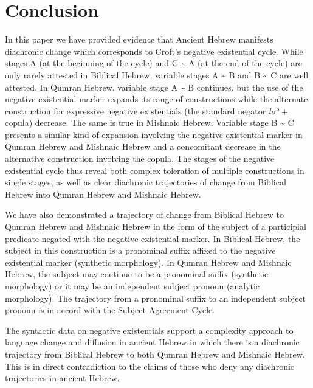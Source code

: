 \documentclass[output=paper,colorlinks,citecolor=brown,draft,draftmode]{langscibook}
\begin{document}
\section{Conclusion}\label{sec:Hebrew-5}
%
In this paper we have provided evidence that Ancient Hebrew manifests
diachronic change which corresponds to Croft's negative existential cycle.
While stages A (at the beginning of the cycle) and C {\textasciitilde} A
(at the end of the cycle) are only rarely attested in Biblical Hebrew,
variable stages A {\textasciitilde} B and B {\textasciitilde} C are well
attested. In Qumran Hebrew, variable stage A {\textasciitilde} B continues,
but the use of the negative existential marker expands its range of
constructions while the alternate construction for expressive negative
existentials (the standard negator \textit{lōʾ} + copula)
decrease. The same is true in Mishnaic Hebrew. Variable stage B
{\textasciitilde} C presents a similar kind of expansion involving the
negative existential marker in Qumran Hebrew and Mishnaic Hebrew and a
concomitant decrease in the alternative construction involving the copula.
The stages of the negative existential cycle thus reveal both complex
toleration of multiple constructions in single stages, as well as clear
diachronic trajectories of change from Biblical Hebrew into Qumran Hebrew
and Mishnaic Hebrew.

We have also demonstrated a trajectory of change from Biblical Hebrew to
Qumran Hebrew and Mishnaic Hebrew in the form of the subject of a
participial predicate negated with the negative existential marker. In
Biblical Hebrew, the subject in this construction is a pronominal suffix
affixed to the negative existential marker (synthetic morphology). In
Qumran Hebrew and Mishnaic Hebrew, the subject may continue to be a
pronominal suffix (synthetic morphology) or it may be an independent
subject pronoun (analytic morphology). The trajectory from a pronominal
suffix to an independent subject pronoun is in accord with the Subject
Agreement Cycle.

The syntactic data on negative existentials support a complexity approach
to language change and diffusion in ancient Hebrew in which there is a
diachronic trajectory from Biblical Hebrew to both Qumran Hebrew and
Mishnaic Hebrew. This is in direct contradiction to the claims of those who
deny any diachronic trajectories in ancient Hebrew.

\end{document}
